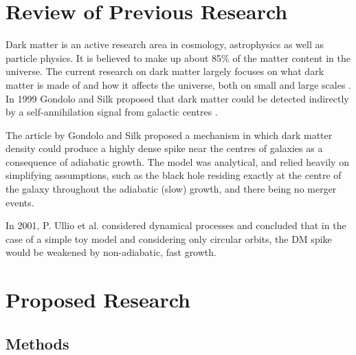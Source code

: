 \documentclass[a4paper,10pt]{article}
\begin{document}
\section{Review of Previous Research}


Dark matter is an active research area in cosmology, astrophysics as well as particle physics. It is believed to make up about 85\% of the matter content in the universe. The current research on dark matter largely focuses on what dark matter is made of and how it affects the universe, both on small and large scales \citep{this_probably_doesnt_need_a_citation}. In 1999 Gondolo and Silk proposed that dark matter could be detected indirectly by a self-annihilation signal from galactic centres \citep{GS_1999_original}. %

The article by Gondolo and Silk proposed a mechanism in which dark matter density could produce a highly dense spike near the centres of galaxies as a consequence of adiabatic growth. The model was analytical, and relied heavily on simplifying assumptions, such as the black hole residing exactly at the centre of the galaxy throughout the adiabatic (slow) growth, and there being no merger events. %

In 2001, P. Ullio et al. considered dynamical processes and concluded that in the case of a simple toy model and considering 
only circular orbits, the DM spike would be weakened by non-adiabatic, fast growth.




\section{Proposed Research}


\subsection{Methods}

\end{document}
